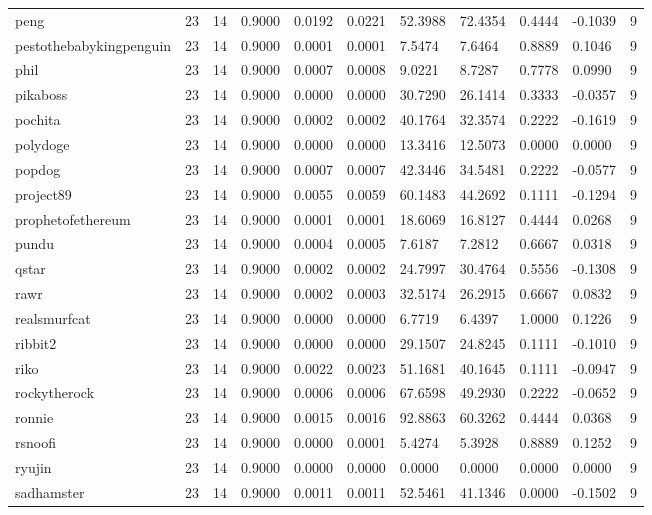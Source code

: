\begin{table}[htbp]
\begin{tabular}{lllllllllll}
peng & 23 & 14 & 0.9000 & 0.0192 & 0.0221 & 52.3988 & 72.4354 & 0.4444 & -0.1039 & 9 \\
pestothebabykingpenguin & 23 & 14 & 0.9000 & 0.0001 & 0.0001 & 7.5474 & 7.6464 & 0.8889 & 0.1046 & 9 \\
phil & 23 & 14 & 0.9000 & 0.0007 & 0.0008 & 9.0221 & 8.7287 & 0.7778 & 0.0990 & 9 \\
pikaboss & 23 & 14 & 0.9000 & 0.0000 & 0.0000 & 30.7290 & 26.1414 & 0.3333 & -0.0357 & 9 \\
pochita & 23 & 14 & 0.9000 & 0.0002 & 0.0002 & 40.1764 & 32.3574 & 0.2222 & -0.1619 & 9 \\
polydoge & 23 & 14 & 0.9000 & 0.0000 & 0.0000 & 13.3416 & 12.5073 & 0.0000 & 0.0000 & 9 \\
popdog & 23 & 14 & 0.9000 & 0.0007 & 0.0007 & 42.3446 & 34.5481 & 0.2222 & -0.0577 & 9 \\
project89 & 23 & 14 & 0.9000 & 0.0055 & 0.0059 & 60.1483 & 44.2692 & 0.1111 & -0.1294 & 9 \\
prophetofethereum & 23 & 14 & 0.9000 & 0.0001 & 0.0001 & 18.6069 & 16.8127 & 0.4444 & 0.0268 & 9 \\
pundu & 23 & 14 & 0.9000 & 0.0004 & 0.0005 & 7.6187 & 7.2812 & 0.6667 & 0.0318 & 9 \\
qstar & 23 & 14 & 0.9000 & 0.0002 & 0.0002 & 24.7997 & 30.4764 & 0.5556 & -0.1308 & 9 \\
rawr & 23 & 14 & 0.9000 & 0.0002 & 0.0003 & 32.5174 & 26.2915 & 0.6667 & 0.0832 & 9 \\
realsmurfcat & 23 & 14 & 0.9000 & 0.0000 & 0.0000 & 6.7719 & 6.4397 & 1.0000 & 0.1226 & 9 \\
ribbit2 & 23 & 14 & 0.9000 & 0.0000 & 0.0000 & 29.1507 & 24.8245 & 0.1111 & -0.1010 & 9 \\
riko & 23 & 14 & 0.9000 & 0.0022 & 0.0023 & 51.1681 & 40.1645 & 0.1111 & -0.0947 & 9 \\
rockytherock & 23 & 14 & 0.9000 & 0.0006 & 0.0006 & 67.6598 & 49.2930 & 0.2222 & -0.0652 & 9 \\
ronnie & 23 & 14 & 0.9000 & 0.0015 & 0.0016 & 92.8863 & 60.3262 & 0.4444 & 0.0368 & 9 \\
rsnoofi & 23 & 14 & 0.9000 & 0.0000 & 0.0001 & 5.4274 & 5.3928 & 0.8889 & 0.1252 & 9 \\
ryujin & 23 & 14 & 0.9000 & 0.0000 & 0.0000 & 0.0000 & 0.0000 & 0.0000 & 0.0000 & 9 \\
sadhamster & 23 & 14 & 0.9000 & 0.0011 & 0.0011 & 52.5461 & 41.1346 & 0.0000 & -0.1502 & 9 \\

\end{tabular}
\end{table}
